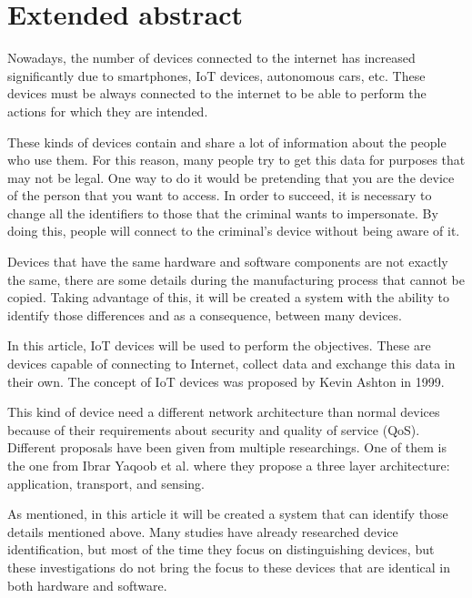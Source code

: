 
\chapter*{Extended abstract}
 \label{chap:abstract}

Nowadays, the number of devices connected to the internet has increased significantly due to smartphones, IoT devices, autonomous cars, etc. These devices must be always connected to the internet to be able to perform the actions for which they are intended. 


These kinds of devices contain and share a lot of information about the people who use them. For this reason, many people try to get this data for purposes that may not be legal. One way to do it would be pretending that you are the device of the person that you want to access. In order to succeed, it is necessary to change all the identifiers to those that the criminal wants to impersonate. By doing this, people will connect to the criminal's device without being aware of it.


Devices that have the same hardware and software components are not exactly the same, there are some details during the manufacturing process that cannot be copied. Taking advantage of this, it will be created a system with the ability to identify those differences and as a consequence, between many devices.

In this article, IoT devices will be used to perform the objectives. These are devices capable of connecting to Internet, collect data and exchange this data in their own. The concept of IoT devices was proposed by Kevin Ashton in 1999.

This kind of device need a different network architecture than normal devices because of their requirements about security and quality of service (QoS). Different proposals have been given from multiple researchings. One of them is the one from Ibrar Yaqoob et al. \cite{yaqoob2017internet} where they propose a three layer architecture: application, transport, and sensing.

As mentioned, in this article it will be created a system that can identify those details mentioned above. Many studies have already researched device identification, but most of the time they focus on distinguishing devices, but these investigations do not bring the focus to these devices that are identical in both hardware and software.

